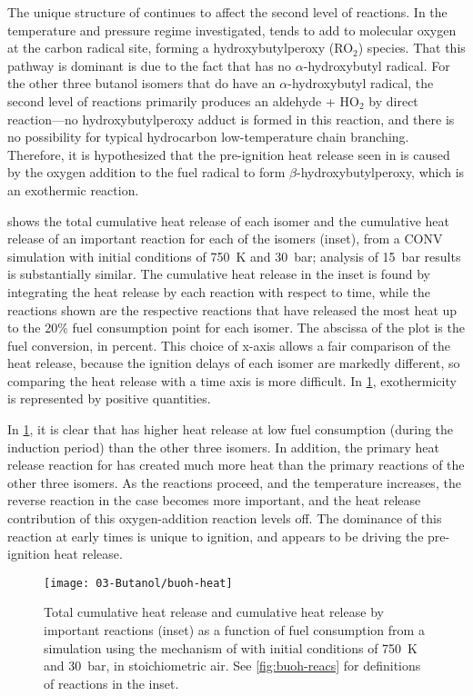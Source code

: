 \documentclass[../main.tex]{subfiles}
\begin{document}
The unique structure of \tBuOH{} continues to affect the second level
of reactions. In the temperature and pressure regime investigated,
\tBuOH{} tends to add to molecular oxygen at the carbon radical site,
forming a hydroxybutylperoxy (RO$_2$) species. That this pathway is dominant is
due to the fact that \tBuOH{} has no $\alpha$-hydroxybutyl radical.
For the other three butanol isomers that do have an $\alpha$-hydroxybutyl
radical, the second level of reactions primarily produces an aldehyde + HO$_2$
by direct reaction–--no hydroxybutylperoxy adduct is formed in this reaction,
and there is no possibility for typical hydrocarbon low-temperature chain
branching. Therefore, it is hypothesized that the pre-ignition heat release
seen in \tBuOH{} is caused by the oxygen addition to the fuel radical
to form $\beta$-hydroxybutylperoxy, which is an exothermic reaction.

 shows the total cumulative heat release of each isomer
and the cumulative heat release of an important reaction for each of the
isomers (inset), from a CONV simulation with initial conditions of \SI{750}{\kelvin} and
\SI{30}{\bar}; analysis of \SI{15}{\bar} results is substantially similar. The cumulative heat
release in the inset is found by integrating the heat release by each reaction
with respect to time, while the reactions shown are the respective reactions
that have released the most heat up to the 20\% fuel consumption point for each
isomer. The abscissa of the plot is the fuel conversion, in percent. This
choice of x-axis allows a fair comparison of the heat release, because the
ignition delays of each isomer are markedly different, so comparing the heat
release with a time axis is more difficult. In \cref{fig:buoh-heat},
exothermicity is represented by positive quantities.

In \cref{fig:buoh-heat}, it is clear that \tBuOH{} has higher
heat release at low fuel consumption (during the induction period) than the
other three isomers. In addition, the primary heat release reaction for
\tBuOH{} has created much more heat than the primary reactions of the
other three isomers. As the reactions proceed, and the temperature increases,
the reverse reaction in the \tBuOH{} case becomes more important, and
the heat release contribution of this oxygen-addition reaction levels off. The
dominance of this reaction at early times is unique to \tBuOH{}
ignition, and appears to be driving the pre-ignition heat release.

\begin{figure}
    \texttt{[image: 03-Butanol/buoh-heat]}
    \caption{Total cumulative heat release and cumulative heat release by
        important reactions (inset) as a function of fuel consumption from a
        simulation using the mechanism of \textcite{Sarathy2012} with initial
        conditions of \SI{750}{\kelvin} and \SI{30}{\bar}, in stoichiometric air. See
        \cref{fig:buoh-reacs} for definitions of reactions in the inset.}
    \label{fig:buoh-heat}
\end{figure}
\end{document}
